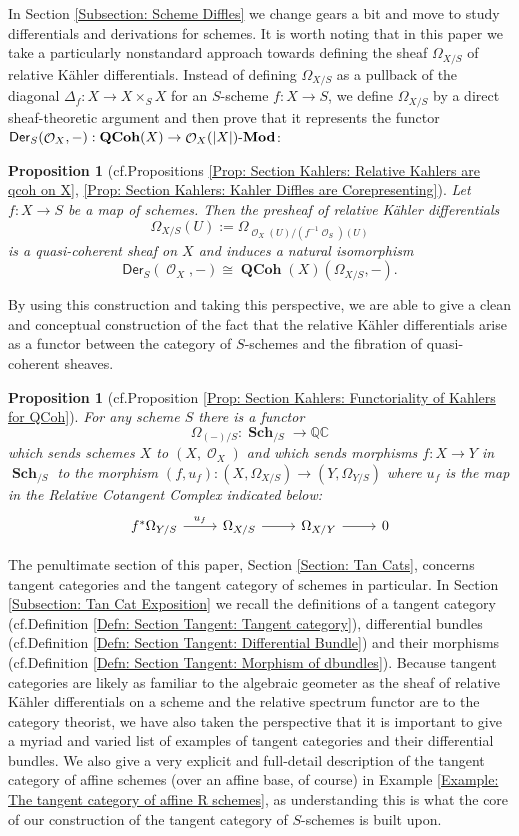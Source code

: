 \documentclass{amsart}
\newtheorem{propx}[thmx]{Proposition}
\theoremstyle{definition}
\DeclareMathOperator{\Ocal}{\mathcal{O}}
\DeclareMathOperator{\Sch}{\mathbf{Sch}}
\DeclareMathOperator{\QCoh}{\mathbf{QCoh}}
\newcommand{\Mod}[1]{{#1}\textnormal{-}\mathbf{Mod}}
\newcommand{\Kah}[2]{\Omega_{{#1}/{#2}}}
\numberwithin{equation}{subsection}
\begin{document}
In Section \ref{Subsection: Scheme Diffles} we change gears a bit and move to study differentials and derivations for schemes. It is worth noting that in this paper we take a particularly nonstandard approach towards defining the sheaf $\Kah{X}{S}$ of relative K{\"a}hler differentials. Instead of defining $\Kah{X}{S}$ as a pullback of the diagonal $\Delta_f:X \to X \times_S X$ for an $S$-scheme $f:X \to S$, we define $\Kah{X}{S}$ by a direct sheaf-theoretic argument and then prove that it represents the functor $\mathsf{Der}_S(\Ocal_X,-):\QCoh(X) \to \Mod{\Ocal_X(\lvert X \rvert)}$:
\begin{propx}[{cf.\@ Propositions \ref{Prop: Section Kahlers: Relative Kahlers are qcoh on X}, \ref{Prop: Section Kahlers: Kahler Diffles are Corepresenting}}]
Let $f:X \to S$ be a map of schemes. Then the presheaf of relative K{\"a}hler differentials
\[
\Kah{X}{S}\left(U\right) := \Kah{\Ocal_X(U)}{(f^{-1}\Ocal_S)(U)}
\] 
is a quasi-coherent sheaf on $X$ and induces a natural isomorphism
\[
\mathsf{Der}_S\left(\Ocal_X,-\right) \cong \QCoh(X)\left(\Kah{X}{S},-\right).
\]
\end{propx}
By using this construction and taking this perspective, we are able to give a clean and conceptual construction of the fact that the relative K{\"a}hler differentials arise as a functor between the category of $S$-schemes and the fibration of quasi-coherent sheaves.
\begin{propx}[{cf.\@ Proposition \ref{Prop: Section Kahlers: Functoriality of Kahlers for QCoh}}]
For any scheme $S$ there is a functor 
\[
\Kah{(-)}{S}:\Sch_{/S} \to \mathbb{QC}
\]
which sends schemes $X$ to $(X,\Ocal_X)$ and which sends morphisms $f:X \to Y$ in $\Sch_{/S}$ to the morphism $(f,u_f):(X,\Kah{X}{S}) \to (Y,\Kah{Y}{S})$ where $u_f$ is the map in the Relative Cotangent Complex indicated below:
\[
\begin{tikzcd}
	f^{\ast}\Kah{Y}{S} \ar[r]{}{u_f}  & \Kah{X}{S} \ar[r] & \Kah{X}{Y} \ar[r] & 0
\end{tikzcd}
\]
\end{propx}

The penultimate section of this paper, Section \ref{Section: Tan Cats}, concerns tangent categories and the tangent category of schemes in particular. In Section \ref{Subsection: Tan Cat Exposition} we recall the definitions of a tangent category (cf.\@ Definition \ref{Defn: Section Tangent: Tangent category}), differential bundles (cf.\@ Definition \ref{Defn: Section Tangent: Differential Bundle}) and their morphisms (cf.\@ Definition \ref{Defn: Section Tangent: Morphism of dbundles}). Because tangent categories are likely as familiar to the algebraic geometer as the sheaf of relative K{\"a}hler differentials on a scheme and the relative spectrum functor are to the category theorist, we have also taken the perspective that it is important to give a myriad and varied list of examples of tangent categories and their differential bundles. We also give a very explicit and full-detail description of the tangent category of affine schemes (over an affine base, of course) in Example \ref{Example: The tangent category of affine R schemes}, as understanding this is what the core of our construction of the tangent category of $S$-schemes is built upon.
\end{document}
